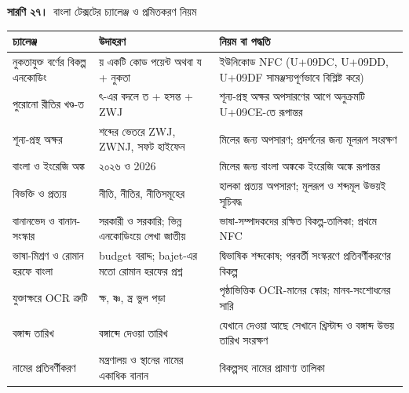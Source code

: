 \documentclass[border=10pt]{standalone}
\begin{document}
\begin{minipage}{17cm}
{\large\bfseries সারণি ২৭।}\ {\large বাংলা টেক্সটের চ্যালেঞ্জ ও প্রমিতকরণ নিয়ম}\par\vspace{7pt}
\small
{}
\begin{tabularx}{\linewidth}{@{}>{\hsize=0.750\hsize\raggedright\arraybackslash}X>{\hsize=0.947\hsize\raggedright\arraybackslash}X>{\hsize=1.303\hsize\raggedright\arraybackslash}X@{}}
\arrayrulecolor{bapilrule}\toprule
\rowcolor{white}\textbf{চ্যালেঞ্জ} & \textbf{উদাহরণ} & \textbf{নিয়ম বা পদ্ধতি} \\
\midrule
নুকতাযুক্ত বর্ণের বিকল্প এনকোডিং & য় একটি কোড পয়েন্ট অথবা য + নুকতা & ইউনিকোড NFC (U+09DC, U+09DD, U+09DF সামঞ্জস্যপূর্ণভাবে বিশ্লিষ্ট করে) \\
পুরোনো রীতির খণ্ড-ত & ৎ-এর বদলে ত + হসন্ত + ZWJ & শূন্য-প্রস্থ অক্ষর অপসারণের আগে অনুক্রমটি U+09CE-তে রূপান্তর \\
শূন্য-প্রস্থ অক্ষর & শব্দের ভেতরে ZWJ, ZWNJ, সফট হাইফেন & মিলের জন্য অপসারণ; প্রদর্শনের জন্য মূলরূপ সংরক্ষণ \\
বাংলা ও ইংরেজি অঙ্ক & ২০২৬ ও 2026 & মিলের জন্য বাংলা অঙ্ককে ইংরেজি অঙ্কে রূপান্তর \\
বিভক্তি ও প্রত্যয় & নীতি, নীতির, নীতিসমূহের & হালকা প্রত্যয় অপসারণ; মূলরূপ ও শব্দমূল উভয়ই সূচিবদ্ধ \\
বানানভেদ ও বানান-সংস্কার & সরকারী ও সরকারি; ভিন্ন এনকোডিংয়ে লেখা জাতীয় & ভাষা-সম্পাদকদের রক্ষিত বিকল্প-তালিকা; প্রথমে NFC \\
ভাষা-মিশ্রণ ও রোমান হরফে বাংলা & budget বরাদ্দ; bajet-এর মতো রোমান হরফের প্রশ্ন & দ্বিভাষিক শব্দকোষ; পরবর্তী সংস্করণে প্রতিবর্ণীকরণের বিকল্প \\
যুক্তাক্ষরে OCR ত্রুটি & ক্ষ, ষ্ণ, ন্ত্র ভুল পড়া & পৃষ্ঠাভিত্তিক OCR-মানের স্কোর; মানব-সংশোধনের সারি \\
বঙ্গাব্দ তারিখ & বঙ্গাব্দে দেওয়া তারিখ & যেখানে দেওয়া আছে সেখানে খ্রিস্টাব্দ ও বঙ্গাব্দ উভয় তারিখ সংরক্ষণ \\
নামের প্রতিবর্ণীকরণ & মন্ত্রণালয় ও স্থানের নামের একাধিক বানান & বিকল্পসহ নামের প্রামাণ্য তালিকা \\
\bottomrule
\end{tabularx}
\par{}
\end{minipage}
\end{document}
